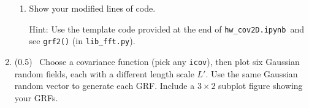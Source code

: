 \documentclass[11pt,titlepage,fleqn]{article}
\newcommand{\tfile}{{\tt hw\_cov2D.ipynb}}
\begin{document}
\begin{enumerate}
\begin{enumerate}
\item Show your modified lines of code.

Hint: Use the template code provided at the end of \tfile\ and see \verb+grf2()+ (in \verb+lib_fft.py+).
\end{enumerate}

\item (0.5) \ptag\ Choose a covariance function (pick any \verb+icov+), then plot six Gaussian random fields, each with a different length scale $L'$. Use the same Gaussian random vector to generate each GRF. Include a $3 \times 2$ subplot figure showing your GRFs.

\end{enumerate}







\end{document}
